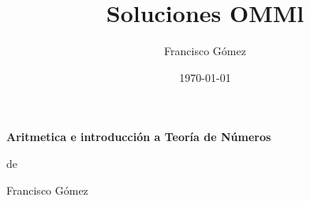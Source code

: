 \documentclass[11pt]{book}
\title{Soluciones OMMl}
\author{Francisco G\'omez}
\date{\today}
\theoremstyle{definition}
\begin{document}
\begin{titlepage}
\vspace*{-3cm}
\makebox[\dimexpr\textwidth+2cm][r] 

\vspace*{5cm}
\begin{center}
\Huge\bfseries Aritm\-etica e introducci\'on a Teor\'ia de N\'umeros

\vspace*{2cm}
\large 
de

Francisco G\'omez
\end{center}

\end{titlepage}

\newpage

\tableofcontents



\printindex
\end{document}
